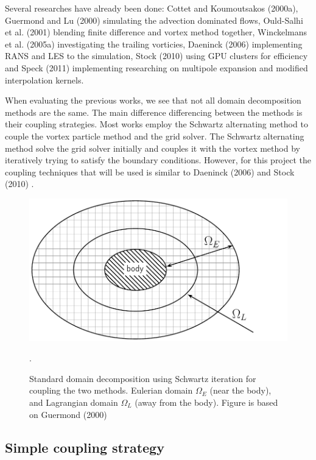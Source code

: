 Several researches have already been done: Cottet and Koumoutsakos (2000a)\cite{Cottet2000a}, Guermond and Lu (2000) \cite{Guermond2000} simulating the advection dominated flows, Ould-Salhi et al. (2001) \cite{Ould-Salihi2001} blending finite difference and vortex method together, Winckelmans et al. (2005a) \cite{Winckelmans2005a} investigating the trailing vorticies, Daeninck (2006) \cite{Daeninck2006} implementing RANS and LES to the simulation, Stock (2010) \cite{Stock} using GPU clusters for efficiency and Speck (2011) \cite{Speck2011a} implementing researching on multipole expansion and modified interpolation kernels.

When evaluating the previous works, we see that not all domain decomposition methods are the same. The main difference differencing between the methods is their coupling strategies. Most works employ the Schwartz alternating method to couple the vortex particle method and the grid solver. The Schwartz alternating method solve the grid solver initially and couples it with the vortex method by iteratively trying to satisfy the boundary conditions. However, for this project the coupling techniques that will be used is similar to Daeninck (2006) \cite{Daeninck2006} and Stock (2010) \cite{Stock}.

	\begin{figure}[!t]
		\centering
		\includegraphics[width=0.5\linewidth]{figures/introduction/domainDecomposition_typical.pdf}
		\caption{Standard domain decomposition using Schwartz iteration for coupling the two methods. Eulerian domain $\Omega_E$ (near the body), and Lagrangian domain $\Omega_L$ (away from the body). Figure is based on Guermond (2000) \cite{Guermond2000}}.
		\label{fig:domainDecomposition}
	\end{figure}

\subsection{Simple coupling strategy}

